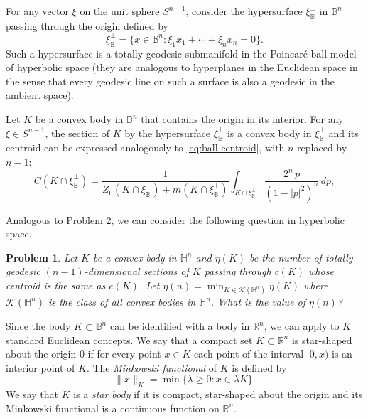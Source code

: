 \documentclass[12pt,letterpaper,reqno]{amsart}
\newtheorem{problem}[theorem]{Problem}
\theoremstyle{definition}
\begin{document}


For any vector $\xi$  on the unit sphere $S^{n-1}$, consider the hypersurface $\xi_{\mathbb B}^\perp$ in $\mathbb B^n$ passing through the origin defined by 
$$\xi_{\mathbb B}^\perp = \{x\in \mathbb B^n: \xi_1 x_1+ \cdots+\xi_n x_n=0\}.$$
Such a hypersurface is a totally geodesic submanifold in the Poincar\'e ball model of hyperbolic space (they are analogous to hyperplanes in the Euclidean space in the sense that every geodesic line on such a surface is also a geodesic in the ambient space). 

Let $K$ be a convex body in $\mathbb B^n$ that contains the origin in its interior. For any $\xi\in S^{n-1}$, the section of $K$ by the hypersurface $\xi_{\mathbb B}^\perp$ is a convex body in $\xi_{\mathbb B}^\perp$ and its centroid can be expressed analogously to \eqref{eq:ball-centroid}, with $n$ replaced by $n-1$:
\begin{equation}\label{eq:section-centroid}
	C(K\cap \xi_{\mathbb B}^\perp)= \frac{1}{Z_0(K\cap\xi_{\mathbb B}^\perp)+m(K\cap \xi_{\mathbb B}^\perp)} \int_{K\cap \xi_{\mathbb B}^\perp}\frac{2^{n}\,p}{(1-|p|^2)^{n}}\,dp,
\end{equation}


Analogous to Problem 2, we can consider the following question in hyperbolic space.
\begin{problem}\label{HyperbolicProblem}
	Let $K$ be a convex body in $\mathbb H^n$ and  $\eta(K)$ be the number of totally geodesic $(n-1)$-dimensional sections of $K$ passing through $c(K)$ whose centroid is the same as $c(K)$. Let $\eta(n) =\displaystyle \min_{K\in \mathcal K({\mathbb H}^n)} \eta(K)$ where $\mathcal K({\mathbb H}^n)$ is the class of all convex bodies in $\mathbb H^n$. What is the value of $\eta(n)$?
	\end{problem}
	
	
	
	Since the body $K\subset \mathbb B^n$ can be identified with a body in $\mathbb R^n$, we can apply to $K$ standard Euclidean concepts. 
	We say that a compact set $K \subset \mathbb{R}^n$ is star-shaped about the origin $0$ if for every point $x \in K$ each point of the interval $[0, x)$ is an interior point of $K$. The {\it Minkowski functional} of $K$ is defined by
	$$
	\|x\|_K = \min\{\lambda \geq 0:  x \in \lambda K \}.
	$$
	We say that $K$ is a {\it  star body} if it is compact, star-shaped about the origin and its Minkowski functional is a continuous function on $\mathbb{R}^n$.
	
\end{document}
